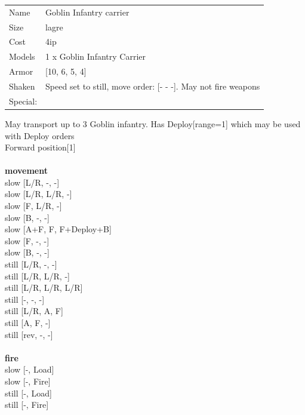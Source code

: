 \begin{tabular}{ll}
  Name & Goblin Infantry carrier \\
  Size & lagre\\
  Cost & 4ip\\
  Models & 1 x Goblin Infantry Carrier\\
  Armor & [10, 6, 5, 4]\\
  Shaken & Speed set to still, move order: [- - -]. May not fire weapons\\
  Special: \\
\end{tabular}

\noindent May transport up to 3 Goblin infantry. Has Deploy[range=1] which may be used with Deploy orders\\ 
Forward position[1]\\ 


\ \\ {\bf movement } \\
slow [L/R, -, -] \\
slow [L/R, L/R, -] \\
slow [F, L/R, -] \\
slow [B, -, -] \\
slow [A+F, F, F+Deploy+B] \\
slow [F, -, -] \\
slow [B, -, -] \\
still [L/R, -, -] \\
still [L/R, L/R, -] \\
still [L/R, L/R, L/R] \\
still [-, -, -] \\
still [L/R, A, F] \\
still [A, F, -] \\
still [rev, -, -] \\
\ \\ {\bf fire } \\
slow [-, Load] \\
slow [-, Fire] \\
still [-, Load] \\
still [-, Fire] \\


